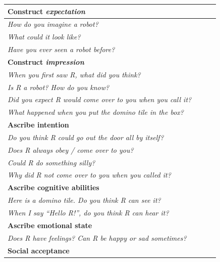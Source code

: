 \documentclass{sig-alternate}
\begin{document}
\begin{table}[h]
\centering
\footnotesize
\begin{tabular}{p{0.9\linewidth}}
    \toprule
    \textbf{Construct \emph{expectation}} \\
    \midrule

    \emph{How do you imagine a robot?} \\
    \emph{What could it look like?} \\
    \emph{Have you ever seen a robot before?} \\

    \toprule
    \textbf{Construct \emph{impression}} \\
    \midrule


    \emph{When you first saw R, what did you think?} \\
    \emph{Is R a robot? How do you know?} \\
    \emph{Did you expect R would come over to you when you call it?} \\
    \emph{What happened when you put the domino tile in the box?} \\

    \toprule
    \textbf{Ascribe intention} \\
    \midrule


    \emph{Do you think R could go out the door all by itself?} \\	
    \emph{Does R always obey / come over to you?} \\
    \emph{Could R do something silly?} \\
    \emph{Why did R not come over to you when you called it?} \\

    \toprule
    \textbf{Ascribe cognitive abilities} \\
    \midrule


    \emph{Here is a domino tile. Do you think R can see it?} \\ 
    \emph{When I say \textit{``Hello R!''}, do you think R can hear it?} \\

    \toprule
    \textbf{Ascribe emotional state} \\
    \midrule


    \emph{Does R have feelings? Can R be happy or sad sometimes?} \\

    \toprule
    \textbf{Social acceptance} \\
    \midrule



\end{tabular}
\end{table}
\end{document}
